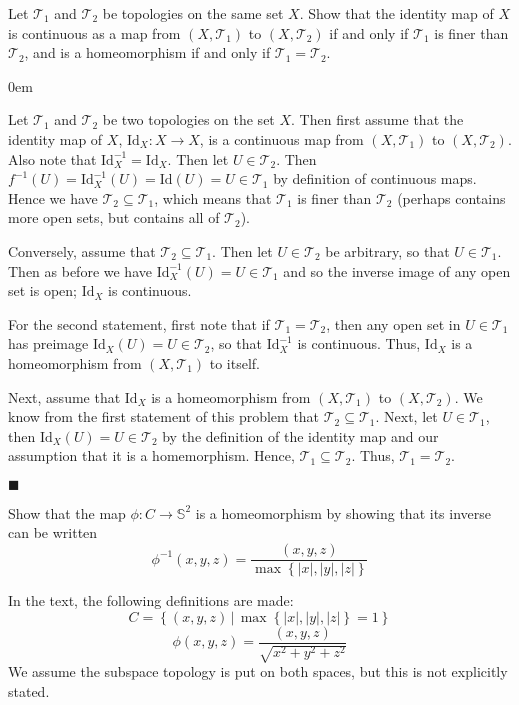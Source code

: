 \documentclass[12pt]{article}
\renewcommand{\qed}{\hfill$\blacksquare$}
\renewenvironment{proof}{\begin{addmargin}[1em]{0em}\begin{newproof}}{\end{newproof}\end{addmargin}\qed}
\newenvironment{exercise}[2][Exercise]{\begin{trivlist}
\item[\hskip \labelsep {\bfseries #1}\hskip \labelsep {\bfseries #2.}]}{\end{trivlist}}
\begin{document}
\begin{exercise}{2.23}
Let $\mathcal{T}_1$ and $\mathcal{T}_2$ be topologies on the same set $X$. Show that the identity map of $X$ is continuous as a map from $\left(X,\mathcal{T}_1\right)$ to $\left(X,\mathcal{T}_2\right)$ if and only if $\mathcal{T}_1$ is finer than $\mathcal{T}_2$, and is a homeomorphism if and only if $\mathcal{T}_1 =\mathcal{T}_2$.
\end{exercise}
\begin{proof}
Let $\mathcal{T}_1$ and $\mathcal{T}_2$ be two topologies on the set $X$. Then first assume that the identity map of $X$, $\text{Id}_X:X\rightarrow X$, is a continuous map from $\left(X,\mathcal{T}_1\right)$ to $\left(X,\mathcal{T}_2\right)$. Also note that $\text{Id}_X^{-1}=\text{Id}_X$. Then let $U\in \mathcal{T}_2$. Then $f^{-1}\left(U\right) = \text{Id}^{-1}_X \left(U\right) = \text{Id}\left(U\right) = U \in \mathcal{T}_1$ by definition of continuous maps. Hence we have $\mathcal{T}_2 \subseteq \mathcal{T}_1$, which means that $\mathcal{T}_1$ is finer than $\mathcal{T}_2$ (perhaps contains more open sets, but contains all of $\mathcal{T}_2$).

Conversely, assume that $\mathcal{T}_2 \subseteq \mathcal{T}_1$. Then let $U \in \mathcal{T}_2$ be arbitrary, so that $U\in \mathcal{T}_1$. Then as before we have $\text{Id}_X^{-1}\left(U\right)=U \in \mathcal{T}_1$ and so the inverse image of any open set is open; $\text{Id}_X$ is continuous.

For the second statement, first note that if $\mathcal{T}_1=\mathcal{T}_2$, then  any open set in $U\in \mathcal{T}_1$ has preimage $\text{Id}_X\left(U\right) = U\in \mathcal{T}_2$, so that $\text{Id}_X^{-1}$ is continuous. Thus, $\text{Id}_X$ is a homeomorphism from $\left(X,\mathcal{T}_1\right)$ to itself.

Next, assume that $\text{Id}_X$ is a homeomorphism from $\left(X,\mathcal{T}_1\right)$ to $\left(X,\mathcal{T}_2\right)$. We know from the first statement of this problem that $\mathcal{T}_2 \subseteq \mathcal{T}_1$. Next, let $U\in \mathcal{T}_1$, then $\text{Id}_X\left(U\right) = U \in \mathcal{T}_2$ by the definition of the identity map and our assumption that it is a homemorphism. Hence, $\mathcal{T}_1 \subseteq \mathcal{T}_2$. Thus, $\mathcal{T}_1 = \mathcal{T}_2$.
\end{proof}



\begin{exercise}{2.27}
Show that the map $\phi:C\rightarrow \mathbb{S}^2$ is a homeomorphism by showing that its inverse can be written
$$ \phi^{-1}\left(x,y,z\right) = \frac{\left(x,y,z\right)}{\max \left\{\left|x\right|,\left|y\right|,\left|z\right|\right\}}$$
\end{exercise}
In the text, the following definitions are made:
$$ C = \left\{ \left(x,y,z\right) \, | \, \max\left\{\left|x\right|,\left|y\right|,\left|z\right|\right\} = 1\right\} $$
$$ \phi\left(x,y,z\right) = \frac{\left(x,y,z\right)}{\sqrt{x^2+y^2+z^2}} $$
We assume the subspace topology is put on both spaces, but this is not explicitly stated.
\end{document}
